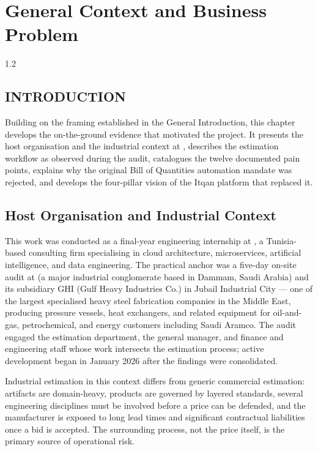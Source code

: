 \chapter{General Context and Business Problem}
\begin{spacing}{1.2}
\minitoc
\thispagestyle{MyStyle}
\end{spacing}
\newpage

\section*{INTRODUCTION}
Building on the framing established in the General Introduction, this chapter develops the on-the-ground evidence that motivated the project. It presents the host organisation and the industrial context at \clientCompany, describes the estimation workflow as observed during the audit, catalogues the twelve documented pain points, explains why the original Bill of Quantities automation mandate was rejected, and develops the four-pillar vision of the Itqan platform that replaced it.

\section{Host Organisation and Industrial Context}
This work was conducted as a final-year engineering internship at \hostCompany, a Tunisia-based consulting firm specialising in cloud architecture, microservices, artificial intelligence, and data engineering. The practical anchor was a five-day on-site audit at \clientCompany (a major industrial conglomerate based in Dammam, Saudi Arabia) and its subsidiary GHI (Gulf Heavy Industries Co.) in Jubail Industrial City --- one of the largest specialised heavy steel fabrication companies in the Middle East, producing pressure vessels, heat exchangers, and related equipment for oil-and-gas, petrochemical, and energy customers including Saudi Aramco. The audit engaged the estimation department, the general manager, and finance and engineering staff whose work intersects the estimation process; active development began in January 2026 after the findings were consolidated.

Industrial estimation in this context differs from generic commercial estimation: artifacts are domain-heavy, products are governed by layered standards, several engineering disciplines must be involved before a price can be defended, and the manufacturer is exposed to long lead times and significant contractual liabilities once a bid is accepted. The surrounding process, not the price itself, is the primary source of operational risk.

